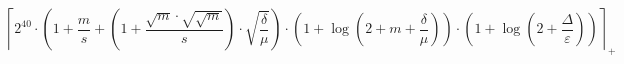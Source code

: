 \[\left\lceil 2^{40} \cdot \left(1 + \frac{m}{s} + \left(1 + \frac{\sqrt{m} \cdot \sqrt{\sqrt{m}}}{s}\right) \cdot \sqrt{\frac{\delta}{\mu}}\right) \cdot \left(1 + \log\left(2 + m + \frac{\delta}{\mu}\right)\right) \cdot \left(1 + \log\left(2 + \frac{\Delta}{\varepsilon}\right)\right) \right\rceil_{+}\]
